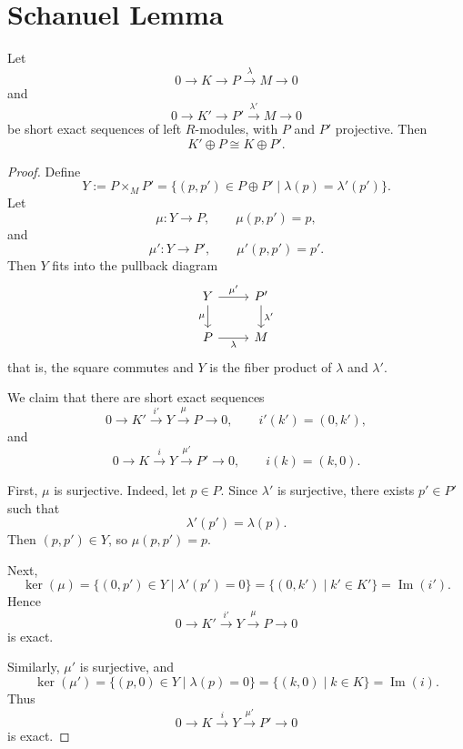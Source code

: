 \section{Schanuel Lemma}

\begin{theorem}
    Let
    \[
        0\longrightarrow K \longrightarrow P \xrightarrow{\,\lambda\,} M \longrightarrow 0
    \]
    and
    \[
        0\longrightarrow K' \longrightarrow P' \xrightarrow{\,\lambda'\,} M \longrightarrow 0
    \]
    be short exact sequences of left $R$-modules, with $P$ and $P'$ projective. Then
    \[
        K'\oplus P \cong K\oplus P'.
    \]
\end{theorem}

\begin{proof}
    Define
    \[
        Y:=P\times_M P'
        =\{(p,p')\in P\oplus P' \mid \lambda(p)=\lambda'(p')\}.
    \]
    Let
    \[
        \mu:Y\to P,\qquad \mu(p,p')=p,
    \]
    and
    \[
        \mu':Y\to P',\qquad \mu'(p,p')=p'.
    \]
    Then $Y$ fits into the pullback diagram
    \[
        \begin{tikzcd}
            Y \arrow[r, "\mu'"] \arrow[d, "\mu"']
            & P' \arrow[d, "\lambda'"] \\
            P \arrow[r, "\lambda"']
            & M
        \end{tikzcd}
    \]
    that is, the square commutes and $Y$ is the fiber product of $\lambda$ and $\lambda'$.

    We claim that there are short exact sequences
    \[
        0\longrightarrow K' \xrightarrow{\,i'\,} Y \xrightarrow{\,\mu\,} P \longrightarrow 0,
        \qquad i'(k')=(0,k'),
    \]
    and
    \[
        0\longrightarrow K \xrightarrow{\,i\,} Y \xrightarrow{\,\mu'\,} P' \longrightarrow 0,
        \qquad i(k)=(k,0).
    \]

    First, $\mu$ is surjective. Indeed, let $p\in P$. Since $\lambda'$ is surjective,
    there exists $p'\in P'$ such that
    \[
        \lambda'(p')=\lambda(p).
    \]
    Then $(p,p')\in Y$, so $\mu(p,p')=p$.

    Next,
    \[
        \ker(\mu)
        =\{(0,p')\in Y \mid \lambda'(p')=0\}
        =\{(0,k') \mid k'\in K'\}
        =\operatorname{Im}(i').
    \]
    Hence
    \[
        0\longrightarrow K' \xrightarrow{\,i'\,} Y \xrightarrow{\,\mu\,} P \longrightarrow 0
    \]
    is exact.

    Similarly, $\mu'$ is surjective, and
    \[
        \ker(\mu')
        =\{(p,0)\in Y \mid \lambda(p)=0\}
        =\{(k,0) \mid k\in K\}
        =\operatorname{Im}(i).
    \]
    Thus
    \[
        0\longrightarrow K \xrightarrow{\,i\,} Y \xrightarrow{\,\mu'\,} P' \longrightarrow 0
    \]
    is exact.


\end{proof}
